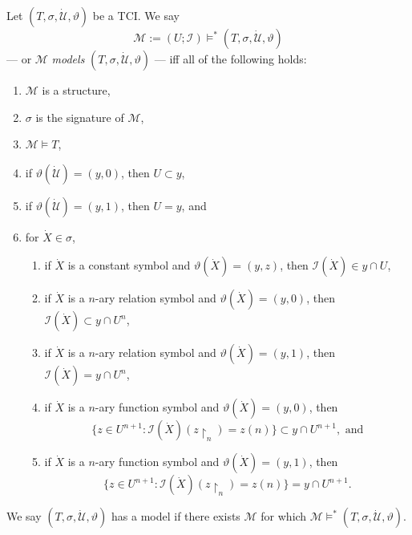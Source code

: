 \documentclass[12pt]{article}
\numberwithin{equation}{section}
\begin{document}
\begin{defi}
Let $(T, \sigma, \dot{\mathcal{U}}, \vartheta)$ be a TCI. We say $$\mathcal{M} := (U; \mathcal{I}) \models^* (T, \sigma, \dot{\mathcal{U}}, \vartheta)$$ --- or $\mathcal{M}$ \emph{models} $(T, \sigma, \dot{\mathcal{U}}, \vartheta)$ --- iff all of the following holds:
\begin{enumerate}[label=(\alph*)]
    \item $\mathcal{M}$ is a structure,
    \item $\sigma$ is the signature of $\mathcal{M}$,
    \item $\mathcal{M} \models T$,
    \item if $\vartheta(\dot{\mathcal{U}}) = (y, 0)$, then $U \subset y$,
    \item if $\vartheta(\dot{\mathcal{U}}) = (y, 1)$, then $U = y$, and
    \item for $\dot{X} \in \sigma$,
    \begin{enumerate}[label=(\roman*)]
        \item if $\dot{X}$ is a constant symbol and $\vartheta(\dot{X}) = (y, z)$, then $\mathcal{I}(\dot{X}) \in y \cap U$,
        \item if $\dot{X}$ is a $n$-ary relation symbol and $\vartheta(\dot{X}) = (y, 0)$, then $\mathcal{I}(\dot{X}) \subset y \cap U^{n}$,
        \item if $\dot{X}$ is a $n$-ary relation symbol and $\vartheta(\dot{X}) = (y, 1)$, then $\mathcal{I}(\dot{X}) = y \cap U^{n}$,
        \item if $\dot{X}$ is a $n$-ary function symbol and $\vartheta(\dot{X}) = (y, 0)$, then $$\{z \in U^{n+1} : \mathcal{I}(\dot{X})(z \! \restriction_n) = z(n)\} \subset y \cap U^{n+1}, \text{ and}$$
        \item if $\dot{X}$ is a $n$-ary function symbol and $\vartheta(\dot{X}) = (y, 1)$, then $$\{z \in U^{n+1} : \mathcal{I}(\dot{X})(z \! \restriction_n) = z(n)\} = y \cap U^{n+1}.$$
    \end{enumerate}
\end{enumerate}
We say $(T, \sigma, \dot{\mathcal{U}}, \vartheta)$ has a model if there exists $\mathcal{M}$ for which $\mathcal{M} \models^* (T, \sigma, \dot{\mathcal{U}}, \vartheta)$.
\end{defi}
\end{document}
